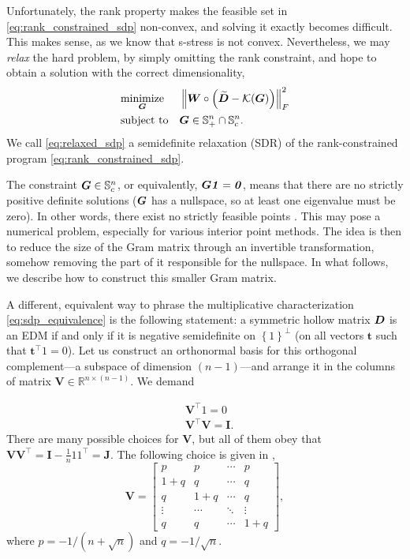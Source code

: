 \documentclass[10pt,double]{IEEEtran}
\providecommand{\R}{\ensuremath{\mathbb{R}}}
\renewcommand{\S}{\ensuremath{\mathbb{S}}}
\providecommand{\norm}[1]{\left\lVert#1\right\rVert}
\providecommand{\set}[1]{\left\{#1\right\}}
\renewcommand{\vec}[1]{\ensuremath{\boldsymbol{#1}}}
\providecommand{\mat}[1]{\ensuremath{\boldsymbol{#1}}}
\providecommand{\wt}[1]{\ensuremath{\widetilde{#1}}}
\providecommand{\mI}{\mat{I}} \providecommand{\mJ}{\mat{J}}
\providecommand{\mV}{\mat{V}} \providecommand{\mT}{\mat{T}}
\providecommand{\mW}{\mat{W}}
\providecommand{\vt}{\vec{t}}
\newcommand{\EDMgram}{\ensuremath{\mathcal{K}}}
\newcommand{\vone}{\ensuremath{\vec{\mathit{1}}}}
\renewcommand{\vzero}{\ensuremath{\vec{\mathit{0}}}}
\newcommand{\T}{\ensuremath{\top}}
\newcommand{\rev}[1]{{#1}}
\begin{document}
Unfortunately, the rank property makes the feasible set in
\eqref{eq:rank_constrained_sdp} non-convex, and solving it exactly becomes
difficult. This makes sense, as we know that s-stress is not convex.
Nevertheless, we may \emph{relax} the hard problem, by simply omitting the
rank constraint, and hope to obtain a solution with the correct dimensionality,
\begin{equation}
\label{eq:relaxed_sdp}
\begin{aligned}
& \underset{\mG}{\text{minimize}}
& & \norm{\mW \circ \left(\wt{\mD} - \EDMgram(\mG)\right)}_F^2 \\
& \text{subject to}
& & \mG \in \S^{n}_+ \cap \S^n_c.
\end{aligned}
\end{equation}
We call \eqref{eq:relaxed_sdp} a semidefinite relaxation (SDR) of the
rank-constrained program
\eqref{eq:rank_constrained_sdp}. 

The constraint $\mG \in \S_c^n$, or equivalently, $\mG \vone = \vzero$, means
that there are no strictly positive definite solutions ($\mG$ has a nullspace,
so at least one eigenvalue must be zero). In other words, there exist no
strictly feasible points
\cite{Krislock:2012xx}. This may pose a numerical problem, especially for
various interior point methods. The idea is then to reduce the size of the
Gram matrix through an invertible transformation, somehow removing the part of
it responsible for the nullspace. \rev{In what follows, we describe how to
construct this smaller Gram matrix.} 

A different, equivalent way to phrase the multiplicative characterization
\eqref{eq:sdp_equivalence} is the following statement: a symmetric hollow
matrix $\mD$ is an EDM if and only if it is negative semidefinite on
$\set{\vone}^\perp$ (on all vectors $\vt$ such that $\vt^\T \vone = 0$). Let
us construct an orthonormal basis for this orthogonal complement---a subspace
of dimension $(n-1)$---and arrange it in the columns of matrix $\mV \in \R^{n
\times (n-1)}$. We demand

\begin{equation}
\label{eq:V_demands}
\begin{aligned}
	&\mV^\T \vone = \vzero \\
	&\mV^\T \mV = \mI. 
\end{aligned}
\end{equation}
There are many possible choices for $\mV$, but all of them obey that
$\mV \mV^\T = \mI - \frac{1}{n}\vone
\vone^\T =  \mJ$. The following choice is given in \cite{Alfakih1999},
\begin{equation}
	\mV = 
	\begin{bmatrix}
		p      &  p     & \cdots  &  p     \\
		1+q    &  q     & \cdots  &  q     \\
		q      & 1+q    & \cdots  &  q     \\
		\vdots & \cdots & \ddots  & \vdots \\
		q      & q      & \cdots  & 1+q
	\end{bmatrix},
\end{equation}
where $p = -1/(n + \sqrt{n})$ and $q = -1 / \sqrt{n}$.
\end{document}
